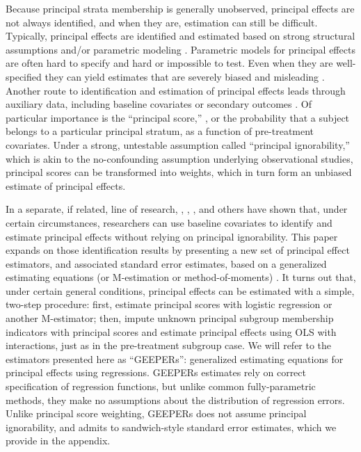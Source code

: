 \documentclass{statsoc} %
\begin{document}
Because principal strata membership is generally unobserved, principal effects are not always identified, and when they are, estimation can still be difficult.
Typically, principal effects are identified and estimated based on strong structural assumptions \citep[e.g.][]{air} and/or parametric modeling \citep[e.g.][]{imbens1997bayesian}.
Parametric models for principal effects are often hard to specify and hard or impossible to test.
Even when they are well-specified they can yield estimates that are severely biased and misleading \citep{griffin2008application,feller2016principal}.
Another route to identification and estimation of principal effects leads through auxiliary data, including baseline covariates or secondary outcomes \citep{mattei2013exploiting}.
Of particular importance is the ``principal score,'' \citep{jo,ding2017principal,feller2017principal}, or the probability that a subject belongs to a particular principal stratum, as a function of pre-treatment covariates.
Under a strong, untestable assumption called ``principal ignorability,'' which is akin to the no-confounding assumption underlying observational studies, principal scores can be transformed into weights, which in turn form an unbiased estimate of principal effects.

In a separate, if related, line of research, \citet{jo2002}, \citet{ding2011}, \citet{jiangDing2021}, and others have shown that, under certain circumstances, researchers can use baseline covariates to identify and estimate principal effects without relying on principal ignorability.
This paper expands on those identification results by presenting a new set of principal effect estimators, and associated standard error estimates, based on a generalized estimating equations (or M-estimation or method-of-moments) \citep{stefanskiBoos}.
It turns out that, under certain general conditions, principal effects can be estimated with a simple, two-step procedure: first, estimate principal scores with logistic regression or another M-estimator; then, impute unknown principal subgroup membership indicators with principal scores and estimate principal effects using OLS with interactions, just as in the pre-treatment subgroup case.
We will refer to the estimators presented here as ``GEEPERs'': generalized estimating equations for principal effects using regressions.
GEEPERs estimates rely on correct specification of regression functions, but unlike common fully-parametric methods, they make no assumptions about the distribution of regression errors.
Unlike principal score weighting, GEEPERs does not assume principal ignorability, and admits to sandwich-style standard error estimates, which we provide in the appendix.
\end{document}
